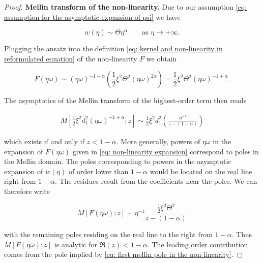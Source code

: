 \documentclass[12pt,twoside]{article}
\theoremstyle{plain}
\theoremstyle{plain}
\theoremstyle{definition}
\theoremstyle{remark}
\numberwithin{equation}{section}
\begin{document}
\begin{proof}
\vspace{10pt}

\textbf{Mellin transform of the non-linearity.} Due to our assumption \eqref{eq: assumption for the asymptotic expansion of psi} we have

\begin{equation}
\label{eq: mellin ansatz}
w(\eta) \sim \Theta \eta^\alpha \qquad \text{as } \eta \rightarrow +\infty.
\end{equation}

Plugging the ansatz into the definition \eqref{eq: kernel and non-linearity in reformulated equation} of the non-linearity $F$ we obtain

\begin{equation}
\label{eq: non-linearity expansion}
F(\eta\omega) \sim (\eta\omega)^{-1-\alpha}\left(\frac 12 \xi^2 \Theta^2  (\eta\omega)^{2\alpha}\right) = \frac 12 \xi^2 \Theta^2  (\eta\omega)^{-1+\alpha}.
\end{equation}

The asymptotics of the Mellin transform of the highest-order term then reads

$$
\begin{aligned}
M\left[\frac{1}{2} \xi^{2} d_{1}^{2} (\eta\omega)^{-1+\alpha}; z\right] \sim \frac{1}{2} \xi^{2} d_{1}^{2} \left(\frac{\eta ^{-z}}{z-(1-\alpha)}\right)
\end{aligned}
$$

which exists if and only if $z<1-\alpha$. More generally, powers of $\eta \omega$ in the expansion of $F(\eta\omega)$ given in \eqref{eq: non-linearity expansion} correspond to poles in the Mellin domain. The poles corresponding to powers in the asymptotic expansion of $w(\eta)$ of order lower than $1-\alpha$ would be located on the real line right from $1-\alpha$. The residues result from the coefficients near the poles. We can therefore write

\begin{equation}
\label{eq: first mellin pole in the non linearity}
M[F(\eta\omega); z] \sim \eta^{-z} \frac{\frac 12 \xi^2 \Theta ^2}{z - (1-\alpha)}
\end{equation}

with the remaining poles residing on the real line to the right from $1 - \alpha$. Thus $M[F(\eta\omega); z]$ is analytic for $\Re(z) < 1-\alpha$. The leading order contribution comes from the pole implied by \eqref{eq: first mellin pole in the non linearity}.

\vspace{10pt}


\end{proof}
\end{document}
